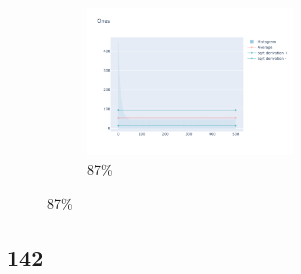 \documentclass[12pt, fleqn]{report}                             %
\theoremstyle{break}                                            %
\begin{document}
\begin{figure}[ht!]
\begin{subfigure}[b]{0.4\linewidth}
          \includegraphics[width=0.6\textwidth]{Images/140/dia-d.png}
          \caption{87\%}
        \end{subfigure}
      \end{figure}


      \clearpage
      \subsection{142}
\end{document}
